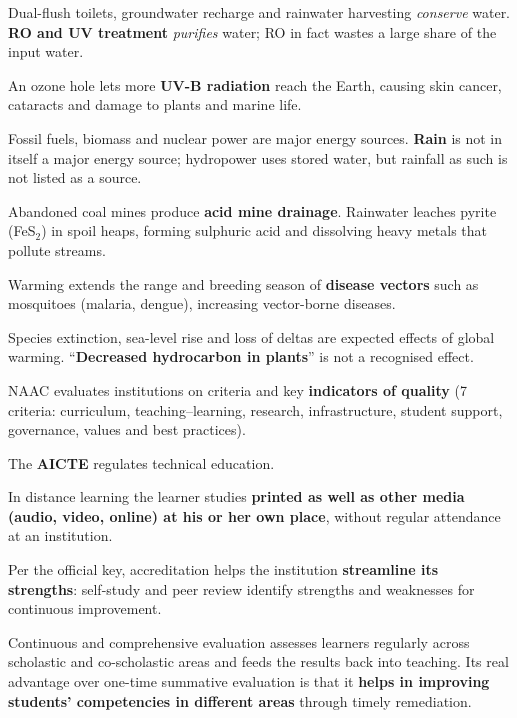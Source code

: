 Dual-flush toilets, groundwater recharge and rainwater harvesting \emph{conserve} water. \textbf{RO and UV treatment} \emph{purifies} water; RO in fact wastes a large share of the input water.

An ozone hole lets more \textbf{UV-B radiation} reach the Earth, causing skin cancer, cataracts and damage to plants and marine life.

Fossil fuels, biomass and nuclear power are major energy sources. \textbf{Rain} is not in itself a major energy source; hydropower uses stored water, but rainfall as such is not listed as a source.

Abandoned coal mines produce \textbf{acid mine drainage}. Rainwater leaches pyrite (FeS$_2$) in spoil heaps, forming sulphuric acid and dissolving heavy metals that pollute streams.

Warming extends the range and breeding season of \textbf{disease vectors} such as mosquitoes (malaria, dengue), increasing vector-borne diseases.

Species extinction, sea-level rise and loss of deltas are expected effects of global warming. ``\textbf{Decreased hydrocarbon in plants}'' is not a recognised effect.

NAAC evaluates institutions on criteria and key \textbf{indicators of quality} (7 criteria: curriculum, teaching--learning, research, infrastructure, student support, governance, values and best practices).

The \textbf{AICTE} regulates technical education.

In distance learning the learner studies \textbf{printed as well as other media (audio, video, online) at his or her own place}, without regular attendance at an institution.

Per the official key, accreditation helps the institution \textbf{streamline its strengths}: self-study and peer review identify strengths and weaknesses for continuous improvement.

Continuous and comprehensive evaluation assesses learners regularly across scholastic and co-scholastic areas and feeds the results back into teaching. Its real advantage over one-time summative evaluation is that it \textbf{helps in improving students' competencies in different areas} through timely remediation.

